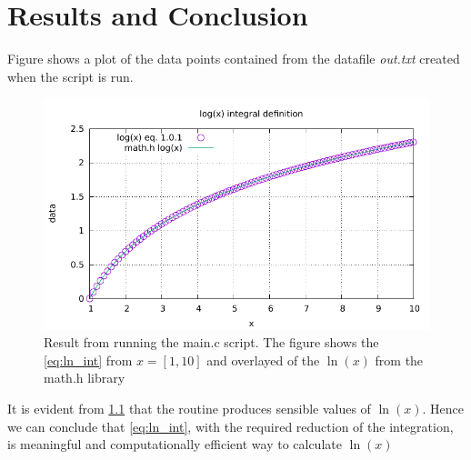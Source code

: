 \documentclass[a4paper,oneside,article,10pt]{memoir}
\numberwithin{equation}{section}
\begin{document}
\chapter{Results and Conclusion}
Figure shows a plot of the data points contained from the datafile \textit{out.txt} created when the script is run.
\begin{figure}[h!]
	\centering
	\includegraphics[]{figure.pdf}
	\caption{Result from running the main.c script. The figure shows the \cref{eq:ln_int} from $x=[1,10]$ and overlayed of the $\ln(x)$ from the math.h library}
	\label{fig.log}
\end{figure}
It is evident from \cref{fig.log} that the routine produces sensible values of $\ln(x)$. Hence we can conclude that \cref{eq:ln_int}, with the required reduction of the integration, is meaningful and computationally efficient way to calculate $\ln(x)$ 
\end{document}
